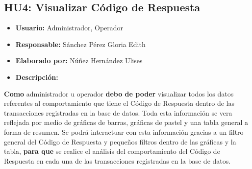 \subsection{HU4: Visualizar Código de Respuesta}
\begin{itemize}
	\item \textbf{Usuario:} Administrador, Operador
	\item \textbf{Responsable:} Sánchez Pérez Gloria Edith
	\item \textbf{Elaborado por:} Núñez Hernández Ulises
	\item \textbf{Descripción:}
\end{itemize}
\textbf{Como} administrador u operador \textbf{debo de poder} visualizar todos los datos referentes al comportamiento que tiene el Código de Respuesta dentro de las transacciones registradas en la base de datos. Toda esta información se vera reflejada por medio de gráficas de barras, gráficas de pastel y una tabla general a forma de resumen. Se podrá interactuar con esta información gracias a un filtro general del Código de Respuesta y pequeños filtros dentro de las gráficas y la tabla, \textbf{para que} se realice el análisis del comportamiento del Código de Respuesta en cada una de las transacciones registradas en la base de datos.